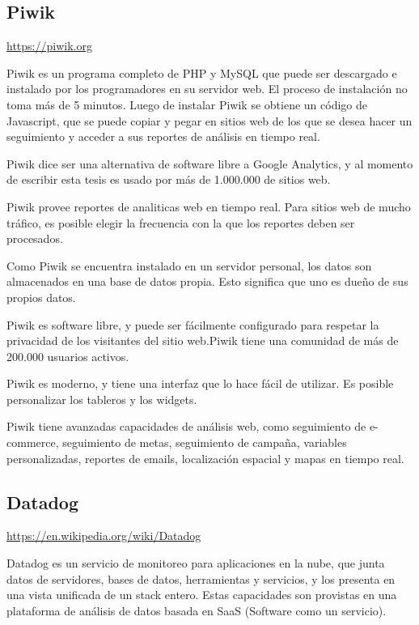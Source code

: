 \subsection{Piwik}

\url{https://piwik.org}

Piwik es un programa completo de PHP y MySQL que puede ser descargado e instalado por los programadores en su servidor web. El proceso de instalación no toma más de 5 minutos. Luego de instalar Piwik se obtiene un código de Javascript, que se puede copiar y pegar en sitios web de los que se desea hacer un seguimiento y acceder a sus reportes de análisis en tiempo real.

Piwik dice ser una alternativa de software libre a Google Analytics, y al momento de escribir esta tesis es usado por más de 1.000.000 de sitios web.



Piwik provee reportes de analiticas web en tiempo real. Para sitios web de mucho tráfico, es posible elegir la frecuencia con la que los reportes deben ser procesados.

Como Piwik se encuentra instalado en un servidor personal, los datos son almacenados en una base de datos propia. Esto significa que uno es dueño de sus propios datos.

Piwik es software libre, y puede ser fácilmente configurado para respetar la privacidad de los visitantes del sitio web.Piwik tiene una comunidad de más de 200.000 usuarios activos.

Piwik es moderno, y tiene una interfaz que lo hace fácil de utilizar. Es posible personalizar los tableros y los widgets.

Piwik tiene avanzadas capacidades de análisis web, como seguimiento de e-commerce, seguimiento de metas, seguimiento de campaña, variables personalizadas, reportes de emails, localización espacial y mapas en tiempo real.


\subsection{Datadog}

\url{https://en.wikipedia.org/wiki/Datadog}

Datadog es un servicio de monitoreo para aplicaciones en la nube, que junta datos de servidores, bases de datos, herramientas y servicios, y los presenta en una vista unificada de un stack entero. Estas capacidades son provistas en una plataforma de análisis de datos  basada en SaaS (Software como un servicio).
 
